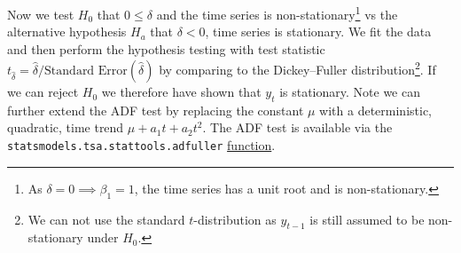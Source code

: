 Now we test $H_{0}$ that $0 \leq \delta$ and the time series is
non-stationary\footnote{As $\delta = 0 \implies \beta_{1} = 1$, \ie the time series has a unit root and is non-stationary.}
vs the alternative hypothesis $H_{a}$ that $\delta < 0$, \ie time series is stationary.
We fit the data and then perform the hypothesis testing with test statistic
$t_{\hat{\delta}} = \hat{\delta} / \text{Standard Error}\left(\hat{\delta}\right)$
by comparing to the Dickey--Fuller distribution\footnote{We can not use the standard $t$-distribution as $y_{t-1}$ is still assumed to be non-stationary under $H_{0}$.}.
If we can reject $H_{0}$ we therefore have shown that $y_{t}$ is stationary.
Note we can further extend the ADF test by replacing the constant $\mu$
with a deterministic, quadratic, time trend $\mu + a_{1} t + a_{2} t^{2}$.
The ADF test is available via the \texttt{statsmodels.tsa.stattools.adfuller}
\href{https://www.statsmodels.org/dev/generated/statsmodels.tsa.stattools.adfuller.html}{function}.

